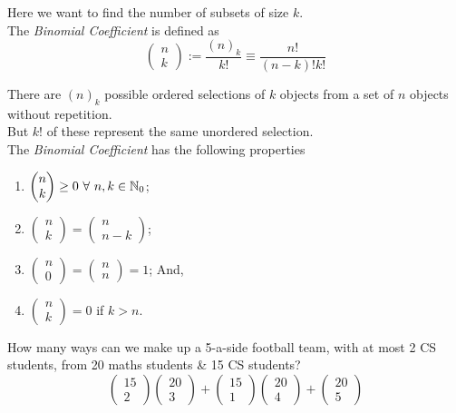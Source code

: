 \documentclass[11pt,a4paper]{article}
\begin{document}
Here we want to find the number of subsets of size $k$.\\

The \textit{Binomial Coefficient} is defined as
$$\begin{pmatrix}n\\k\end{pmatrix}:=\dfrac{(n)_k}{k!}\equiv\dfrac{n!}{(n-k)!k!}$$

There are $(n)_k$ possible ordered selections of $k$ objects from a set of $n$ objects without repetition.\\
But $k!$ of these represent the same unordered selection.\\

The \textit{Binomial Coefficient} has the following properties
\begin{enumerate}[label=\roman*)]
	\item $\begin{pmatrix}n\\k\end{pmatrix}\geq0\ \forall\ n,k\in\nats_0$;
	\item $\begin{pmatrix}n\\k\end{pmatrix}=\begin{pmatrix}n\\n-k\end{pmatrix}$;
	\item $\begin{pmatrix}n\\0\end{pmatrix}=\begin{pmatrix}n\\n\end{pmatrix}=1$; And,
	\item $\begin{pmatrix}n\\k\end{pmatrix}=0$ if $k>n$.
\end{enumerate}

How many ways can we make up a 5-a-side football team, with at most 2 CS students, from 20 maths students \& 15 CS students?\\
$$\begin{pmatrix}15\\2\end{pmatrix}\begin{pmatrix}20\\3\end{pmatrix}+\begin{pmatrix}15\\1\end{pmatrix}\begin{pmatrix}20\\4\end{pmatrix}+\begin{pmatrix}20\\5\end{pmatrix}$$
\end{document}
